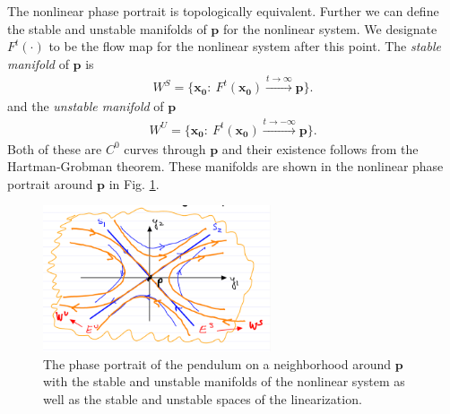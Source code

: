 \begin{ex}
The nonlinear phase portrait is topologically equivalent. Further we can define the stable and unstable manifolds of $\bm{p} $ for the nonlinear system. We designate $F^{t}(\cdot)$ to be the flow map for the nonlinear system after this point.
The \emph{stable manifold} of $\bm{p} $ is 
\begin{align}
	\boxed{
	W^{S} = \{ \bm{x_0} :\ F^{t}(\bm{x_0} ) \xrightarrow{t \to \infty}\bm{p} \}.
}
\end{align}
and the \emph{unstable manifold} of $\bm{p} $
\begin{align}
	\boxed{
	W^{U}=\{\bm{x_0} :\ F^{t}(\bm{x_0} ) \xrightarrow{t \to - \infty}\bm{p}\}.
}
\end{align}
Both of these are $C^{0}$ curves through $\bm{p}$ and their existence follows from the Hartman-Grobman theorem. These manifolds are shown in the nonlinear phase portrait around $\bm{p} $ in Fig. \ref{fig:nonlin_pend_phase_p}. 
\begin{figure}[h!]
	\centering
	\includegraphics[width=0.6\textwidth]{figures/ch2/18nonlin_pend_phase_p.png}
	\caption{The phase portrait of the pendulum on a neighborhood around $\bm{p} $ with the stable and unstable manifolds of the nonlinear system as well as the stable and unstable spaces of the linearization.}
	\label{fig:nonlin_pend_phase_p}
\end{figure}

\end{ex}

